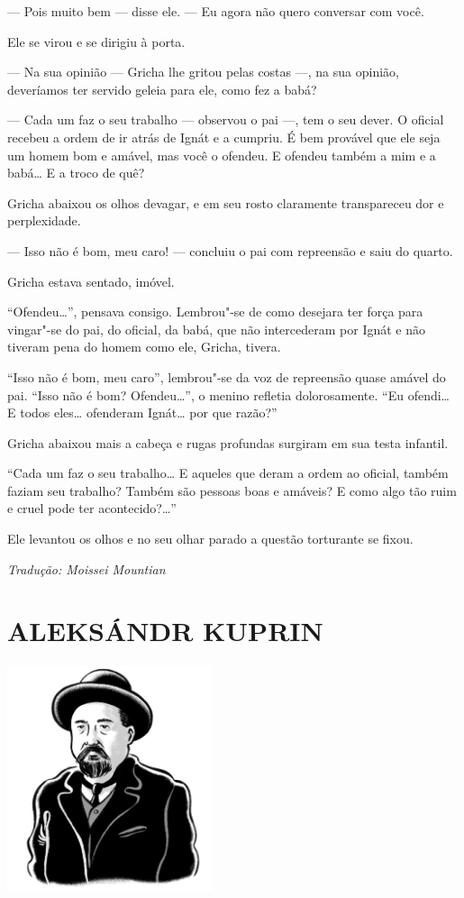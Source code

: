 --- Pois muito bem --- disse ele. --- Eu agora não quero conversar com
você.

Ele se virou e se dirigiu à porta.

--- Na sua opinião --- Gricha lhe gritou pelas costas ---, na sua
opinião, deveríamos ter servido geleia para ele, como fez a babá?

--- Cada um faz o seu trabalho --- observou o pai ---, tem o seu dever.
O oficial recebeu a ordem de ir atrás de Ignát e a cumpriu. É bem
provável que ele seja um homem bom e amável, mas você o ofendeu. E
ofendeu também a mim e a babá\ldots{} E a troco de quê?

Gricha abaixou os olhos devagar, e em seu rosto claramente transpareceu
dor e perplexidade.

--- Isso não é bom, meu caro! --- concluiu o pai com repreensão e saiu
do quarto.

Gricha estava sentado, imóvel.

``Ofendeu\ldots{}'', pensava consigo. Lembrou"-se de como desejara ter força
para vingar"-se do pai, do oficial, da babá, que não intercederam por
Ignát e não tiveram pena do homem como ele, Gricha, tivera.

``Isso não é bom, meu caro'', lembrou"-se da voz de repreensão quase
amável do pai. ``Isso não é bom? Ofendeu\ldots{}'', o menino refletia
dolorosamente. ``Eu ofendi\ldots{} E todos eles\ldots{} ofenderam Ignát\ldots{} por que
razão?''

Gricha abaixou mais a cabeça e rugas profundas surgiram em sua testa
infantil.

``Cada um faz o seu trabalho\ldots{} E aqueles que deram a ordem ao oficial,
também faziam seu trabalho? Também são pessoas boas e amáveis? E como
algo tão ruim e cruel pode ter acontecido?\ldots{}''

Ele levantou os olhos e no seu olhar parado a questão torturante se
fixou.

\medskip

{\footnotesize\hfill\emph{Tradução: Moissei Mountian}}


\part[ALEKSÁNDR KUPRIN]{ALEKSÁNDR KUPRIN }

\pagebreak
\thispagestyle{empty}
\mbox{}
\vfill
\begin{center}
\includegraphics[width=6cm]{./imgs/autor9.jpg}
\end{center}

